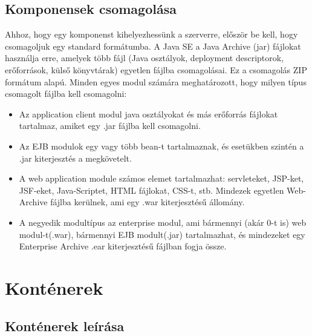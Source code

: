 \documentclass[centeredchapter]{thesis-ekf}
\theoremstyle{definition}
\theoremstyle{remark}
\begin{document}
\subsection{Komponensek csomagolása}

Ahhoz, hogy egy komponenst kihelyezhessünk a szerverre, először be kell, hogy csomagoljuk egy standard formátumba. A Java SE a Java Archive (jar) fájlokat használja erre, amelyek több fájl (Java osztályok, deployment descriptorok, erőforrások, külső könyvtárak) egyetlen fájlba csomagolásai. Ez a csomagolás ZIP formátum alapú.
Minden egyes modul számára meghatározott, hogy milyen típus csomagolt fájlba kell csomagolni:
\begin{itemize}
	\item Az application client modul java osztályokat és más erőforrás fájlokat tartalmaz, amiket egy .jar fájlba kell csomagolni.
	
	\item Az EJB modulok egy vagy több bean-t tartalmaznak, és esetükben szintén a .jar kiterjesztés a megkövetelt.
	
	\item A web application module számos elemet tartalmazhat: servleteket, JSP-ket, JSF-eket, Java-Scriptet, HTML fájlokat, CSS-t, stb. Mindezek egyetlen Web-Archive fájlba kerülnek, ami egy .war kiterjesztésű állomány.
	
	\item A negyedik modultípus az enterprise modul, ami bármennyi (akár 0-t is) web modul-t(.war), bármennyi EJB modult(.jar) tartalmazhat, és mindezeket egy Enterprise Archive .ear kiterjesztésű fájlban fogja össze.
	
\end{itemize} 

\section{Konténerek}

\subsection{Konténerek leírása}
\end{document}
